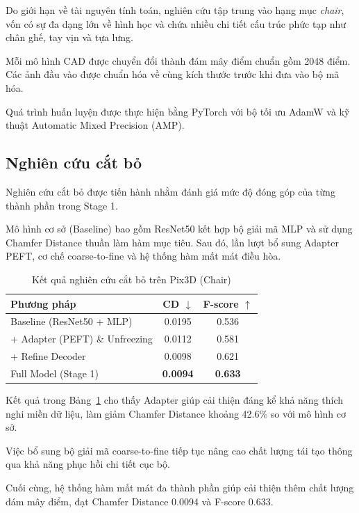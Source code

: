 \documentclass[conference,a4paper]{IEEEtran}
\begin{document}
Do giới hạn về tài nguyên tính toán, nghiên cứu tập trung vào hạng mục \textit{chair}, vốn có sự đa dạng lớn về hình học và chứa nhiều chi tiết cấu trúc phức tạp như chân ghế, tay vịn và tựa lưng.

Mỗi mô hình CAD được chuyển đổi thành đám mây điểm chuẩn gồm 2048 điểm. Các ảnh đầu vào được chuẩn hóa về cùng kích thước trước khi đưa vào bộ mã hóa.

Quá trình huấn luyện được thực hiện bằng PyTorch với bộ tối ưu AdamW và kỹ thuật Automatic Mixed Precision (AMP).

\subsection{Nghiên cứu cắt bỏ}

Nghiên cứu cắt bỏ được tiến hành nhằm đánh giá mức độ đóng góp của từng thành phần trong Stage 1.

Mô hình cơ sở (Baseline) bao gồm ResNet50 kết hợp bộ giải mã MLP và sử dụng Chamfer Distance thuần làm hàm mục tiêu. Sau đó, lần lượt bổ sung Adapter PEFT, cơ chế coarse-to-fine và hệ thống hàm mất mát điều hòa.

\begin{table}[htbp]
\caption{Kết quả nghiên cứu cắt bỏ trên Pix3D (Chair)}
\label{tab:ablation}
\centering
\begin{tabular}{lcc}
\toprule
\textbf{Phương pháp} &
\textbf{CD $\downarrow$} &
\textbf{F-score $\uparrow$} \\
\midrule
Baseline (ResNet50 + MLP) &
0.0195 &
0.536 \\

+ Adapter (PEFT) \&
Unfreezing &
0.0112 &
0.581 \\

+ Refine Decoder &
0.0098 &
0.621 \\

Full Model (Stage 1) &
\textbf{0.0094} &
\textbf{0.633} \\
\bottomrule
\end{tabular}
\end{table}

Kết quả trong Bảng~\ref{tab:ablation} cho thấy Adapter giúp cải thiện đáng kể khả năng thích nghi miền dữ liệu, làm giảm Chamfer Distance khoảng 42.6\% so với mô hình cơ sở.

Việc bổ sung bộ giải mã coarse-to-fine tiếp tục nâng cao chất lượng tái tạo thông qua khả năng phục hồi chi tiết cục bộ.

Cuối cùng, hệ thống hàm mất mát đa thành phần giúp cải thiện thêm chất lượng đám mây điểm, đạt Chamfer Distance 0.0094 và F-score 0.633.
\end{document}
